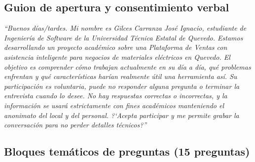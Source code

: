 \subsection{Guion de apertura y consentimiento verbal}
\begin{tcolorbox}[colback=boxbg,colframe=uteqgreen,boxrule=0.7pt,arc=1.5mm,breakable]
\emph{\enquote{Buenos d\'ias/tardes. Mi nombre es Gilces Carranza Jos\'e Ignacio, estudiante de Ingenier\'ia de Software de la Universidad T\'ecnica Estatal de Quevedo. Estamos desarrollando un proyecto acad\'emico sobre una Plataforma de Ventas con asistencia inteligente para negocios de materiales el\'ectricos en Quevedo. El objetivo es comprender c\'omo trabajan actualmente en su d\'ia a d\'ia, qu\'e problemas enfrentan y qu\'e caracter\'isticas har\'ian realmente \'util una herramienta as\'i. Su participaci\'on es voluntaria, puede no responder alguna pregunta o terminar la entrevista cuando lo desee. No hay respuestas correctas o incorrectas, y la informaci\'on se usar\'a estrictamente con fines acad\'emicos manteniendo el anonimato del local y del personal. ?`Acepta participar y me permite grabar la conversaci\'on para no perder detalles t\'ecnicos?}}
\end{tcolorbox}

\subsection{Bloques tem\'aticos de preguntas (15 preguntas)}

